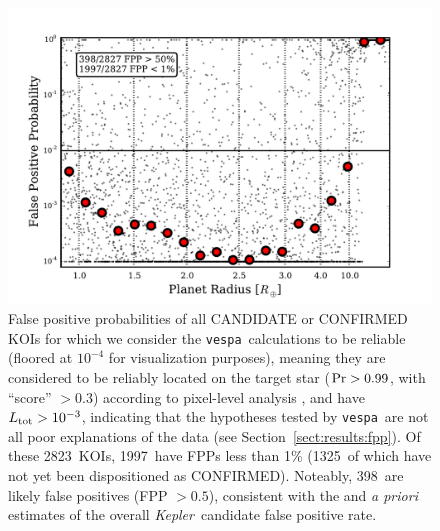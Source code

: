 \documentclass{emulateapj}
\newcommand{\figlabel}[1]{\label{fig:#1}}
\newcommand{\sectionname}{Section}
\newcommand{\Sect}[1]{\sectionname~\ref{sect:#1}}
\newcommand{\sect}[1]{\Sect{#1}}
\newcommand{\nreliable}{2823} %
\newcommand{\nval}{1997} %
\newcommand{\nreliableFP}{398} %
\newcommand{\nvalnew}{1325} %
\newcommand{\posprobthresh}{0.3}
\newcommand{\kepler}{\textit{Kepler}}
\newcommand{\vespa}{\texttt{vespa}}
\begin{document}
\begin{figure}[p]
\begin{center}
\includegraphics[width=7in]{figures/fpp_summary_all.pdf}
\end{center}
\caption{False positive probabilities of all CANDIDATE or CONFIRMED
  KOIs for which we consider the \vespa\ calculations to be reliable
  (floored at $10^{-4}$ for visualization purposes), meaning they are
  considered to be reliably located on the target star ($ {\rm Pr} >
  0.99$, with ``score'' $> \posprobthresh$) according to pixel-level analysis
  \citep{Bryson:KSCI}, and have $L_{\rm tot} > 10^{-3}$, indicating
  that the hypotheses tested by \vespa\ are not all poor explanations
  of the data (see \sect{results:fpp}).  Of these \nreliable\ KOIs,
  \nval\ have FPPs less than 1\% (\nvalnew\ of which have not yet been
  dispositioned as CONFIRMED).  Noteably, \nreliableFP\ are likely
  false positives (FPP $> 0.5$), consistent with the
  \citet{Morton:2011b} and \citet{Fressin:2013} \emph{a priori}
  estimates of the overall \kepler\ candidate false positive rate.
  \figlabel{fppall}}
\end{figure}
\end{document}
